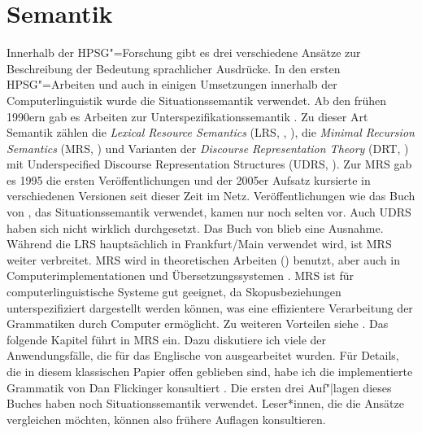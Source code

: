
\chapter{Semantik}
\label{Kapitel-sem}\label{Kapitel-Semantik}


Innerhalb der HPSG"=Forschung gibt es drei verschiedene Ansätze
zur Beschreibung der Bedeutung sprachlicher Ausdrücke. In den ersten
HPSG"=Arbeiten \citep{ps,ps2,Kiss95a,Mueller99a} und auch in einigen Umsetzungen 
innerhalb der Computerlinguistik \citep{MuellerBabel} wurde die Situationssemantik
\citep*{BP83a,CMP90,Devlin92}\nocite{BP87a} verwendet. Ab den frühen 1990ern gab es Arbeiten zur Unterspezifikationssemantik
\citep{Nerbonne93a}. Zu dieser Art Semantik zählen die \emph{Lexical Resource Semantics} (LRS,
\citealt{RS2004a-u,IR2015a-u,Richter2016a-u,SailerRichter2021a-u}, \citealt[Section~6.2]{KR2024a}), die \emph{Minimal Recursion Semantics}
(MRS, \citealt*{CFPS2005a}) und Varianten der \emph{Discourse Representation Theory} (DRT, \citealt{KR93a}) mit Underspecified
Discourse Representation Structures (UDRS, \citealt{FR95a-u}). Zur MRS gab es 1995 die ersten Veröffentlichungen \citep{CFMRS95a-u} und
der 2005er Aufsatz kursierte
in verschiedenen Versionen seit dieser Zeit im Netz. Veröffentlichungen wie das Buch von
\citet{GSag2000a-u}, das Situationssemantik verwendet, kamen nur noch selten vor. Auch UDRS haben
sich nicht wirklich durchgesetzt. Das Buch von \citet{Holler2005a-u} blieb eine Ausnahme.
Während die LRS hauptsächlich in Frankfurt/Main verwendet wird, ist MRS
weiter verbreitet. MRS wird in theoretischen Arbeiten (\zb \citealt{Kiss2001a}) benutzt, aber auch in
Computerimplementationen und Übersetzungssystemen \citep*{FCS2000a,MK2000a,Siegel2000a,BFO2002a-u,MuellerCoreGram}. MRS ist für computerlinguistische Systeme gut geeignet, da
Skopusbeziehungen unterspezifiziert dargestellt werden können, was eine effizientere
Verarbeitung der Grammatiken durch Computer ermöglicht. Zu weiteren Vorteilen siehe \citep*[Abschnitt~2]{CFPS2005a}.
Das folgende Kapitel führt in MRS ein. Dazu diskutiere ich viele der Anwendungsfälle, die für das
Englische von \citet*{CFPS2005a} ausgearbeitet wurden. Für Details, die in diesem klassischen Papier
offen geblieben sind, habe ich die implementierte Grammatik von Dan Flickinger konsultiert
\parencites{Flickinger2000a,FCS2000a}. Die ersten drei Auf"|lagen dieses Buches haben noch
Situationssemantik verwendet. Leser*innen, die die Ansätze vergleichen möchten, können also frühere
Auflagen konsultieren.

